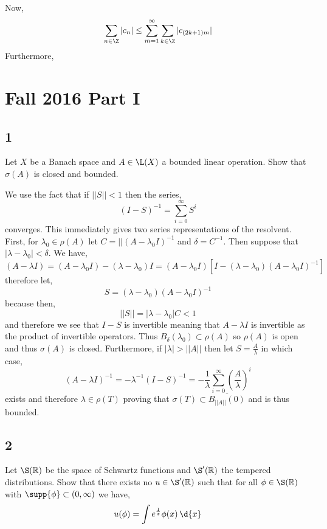 \documentclass[12pt]{article}
\newcommand{\R}{\mathbb{R}}
\begin{document}
 Now,
\[ \sum_{n \in \Z} |c_n| \le \sum_{m = 1}^\infty \sum_{k \in \Z} |c_{(2k + 1)m}| \]
Furthermore, 

\section{Fall 2016 Part I}

\subsection{1}

\begin{exercise}
Let $X$ be a Banach space and $A \in \L(X)$ a bounded linear operation. Show that $\sigma(A)$ is closed and bounded.
\end{exercise}

We use the fact that if $|| S || < 1$ then the series,
\[ (I - S)^{-1} = \sum_{i = 0}^\infty S^i \]
converges. This immediately gives two series representations of the resolvent. First, for $\lambda_0 \in \rho(A)$ let $C = || (A - \lambda_0 I)^{-1}$ and $\delta = C^{-1}$. Then suppose that $| \lambda - \lambda_0 | < \delta$. We have,
\[ (A - \lambda I) = (A - \lambda_0 I) - (\lambda - \lambda_0) I = (A - \lambda_0 I) [I - (\lambda - \lambda_0)(A - \lambda_0 I)^{-1} ] \]
therefore let,
\[ S = (\lambda - \lambda_0) (A - \lambda_0 I)^{-1} \]
because then,
\[ || S || = | \lambda - \lambda_0 | C < 1 \]
and therefore we see that $I - S$ is invertible meaning that $A - \lambda I$ is invertible as the product of invertible operators. Thus $B_\delta(\lambda_0) \subset \rho(A)$ so $\rho(A)$ is open and thus $\sigma(A)$ is closed. Furthermore, if $| \lambda | > || A ||$ then let $S = \frac{A}{\lambda}$ in which case,
\[ (A - \lambda I)^{-1} = - \lambda^{-1} (I - S)^{-1} = - \frac{1}{\lambda} \sum_{i = 0}^\infty \left( \frac{A}{\lambda} \right)^i \]
exists and therefore $\lambda \in \rho(T)$ proving that $\sigma(T) \subset \overline{B_{|| A||}(0)}$ and is thus bounded.

\subsection{2}

\begin{exercise}
Let $\S(\R)$ be the space of Schwartz functions and $\S'(\R)$ the tempered distributions. Show that there exists no $u \in \S'(\R)$ such that for all $\phi \in \S(\R)$ with $\supp{\phi} \subset (0, \infty)$ we have,
\[ u(\phi) = \int e^{\frac{1}{x}} \phi(x) \, \d{x} \]
\end{exercise}
\end{document}
